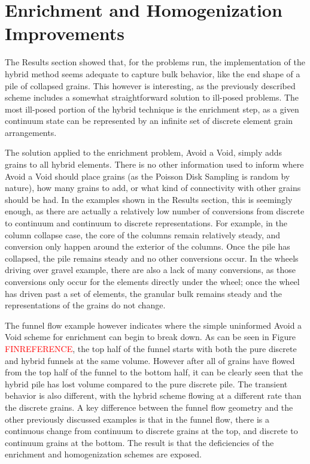 \newcommand\mystrut{\rule[-0.9cm]{0pt}{2cm}}


\chapter{Enrichment and Homogenization Improvements}
The Results section showed that, for the problems run, the implementation of the hybrid method seems adequate to capture bulk behavior, like the end shape of a pile of collapsed grains. This however is interesting, as the previously described scheme includes a somewhat straightforward solution to ill-posed problems. The most ill-posed portion of the hybrid technique is the enrichment step, as a given continuum state can be represented by an infinite set of discrete element grain arrangements.

The solution applied to the enrichment problem, Avoid a Void, simply adds grains to all hybrid elements. There is no other information used to inform where Avoid a Void should place grains (as the Poisson Disk Sampling is random by nature), how many grains to add, or what kind of connectivity with other grains should be had. In the examples shown in the Results section, this is seemingly enough, as there are actually a relatively low number of conversions from discrete to continuum and continuum to discrete representations. For example, in the column collapse case, the core of the columns remain relatively steady, and conversion only happen around the exterior of the columns. Once the pile has collapsed, the pile remains steady and no other conversions occur. In the wheels driving over gravel example, there are also a lack of many conversions, as those conversions only occur for the elements directly under the wheel; once the wheel has driven past a set of elements, the granular bulk remains steady and the representations of the grains do not change.

The funnel flow example however indicates where the simple uninformed Avoid a Void scheme for enrichment can begin to break down. As can be seen in Figure \textcolor{red}{FINREFERENCE}, the top half of the funnel starts with both the pure discrete and hybrid funnels at the same volume. However after all of grains have flowed from the top half of the funnel to the bottom half, it can be clearly seen that the hybrid pile has lost volume compared to the pure discrete pile. The transient behavior is also different, with the hybrid scheme flowing at a different rate than the discrete grains. A key difference between the funnel flow geometry and the other previously discussed examples is that in the funnel flow, there is a continuous change from continuum to discrete grains at the top, and discrete to continuum grains at the bottom. The result is that the deficiencies of the enrichment and homogenization schemes are exposed. 

